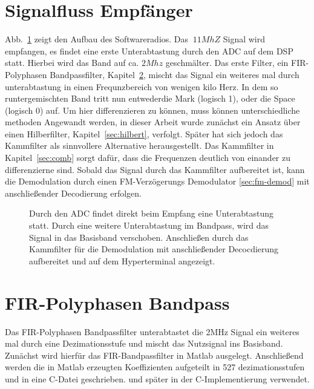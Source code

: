 \documentclass{article}
\begin{document}
\section{Signalfluss Empfänger}

Abb.~\ref{fig:signal} zeigt den Aufbau des Softwareradios. Das $~11MhZ$ Signal wird empfangen, es findet eine erste Unterabtastung durch den ADC auf dem DSP statt.
Hierbei wird das Band auf ca. $2Mhz$ geschmälter. Das erste Filter, ein FIR-Polyphasen Bandpassfilter, Kapitel~\ref{sec:FIR}, mischt das Signal ein weiteres mal durch unterabtastung in einen Frequnzbereich
von wenigen kilo Herz. In dem so runtergemischten Band tritt nun entwederdie Mark (logisch 1), oder die Space (logisch 0) auf. Um hier differenzieren zu können,
muss können unterschiedliche methoden Angewandt werden, in dieser Arbeit wurde zunächst ein Ansatz über einen Hilberfilter, Kapitel~\ref{sec:hilbert}, verfolgt. Später hat sich jedoch das Kammfilter
als sinnvollere Alternative herausgestellt. Das Kammfilter in Kapitel~\ref{sec:comb} sorgt dafür, dass die Frequenzen deutlich von einander zu differenzierne sind. Sobald das Signal durch das Kammfilter
aufbereitet ist, kann die Demodulation durch einen FM-Verzögerungs Demodulator \ref{sec:fm-demod} mit anschließender Decodierung erfolgen.

\begin{figure}[!h]
    \centering
    \def\svgscale{0.5}
    \def\svgwidth{\columnwidth}
    
    \caption{Durch den ADC findet direkt beim Empfang eine Unterabtastung statt. Durch eine weitere Unterabtastung im Bandpass, wird das Signal in das Basisband verschoben.
    Anschließen durch das Kammfilter für die Demodulation mit anschließender Decocdierung aufbereitet und auf dem Hyperterminal angezeigt.}
    \label{fig:signal}
\end{figure}

\section{FIR-Polyphasen Bandpass}\label{sec:FIR}
Das FIR-Polyphasen Bandpassfilter unterabtastet die 2MHz Signal ein weiteres mal durch eine Dezimationsstufe und mischt 
das Nutzsignal ins Basisband. Zunächst wird hierfür das FIR-Bandpassfilter in Matlab ausgelegt.
Anschließend werden die in Matlab erzeugten Koeffizienten aufgeteilt in 527 dezimationsstufen und in eine C-Datei geschrieben.
und später in der C-Implementierung verwendet. 
\end{document}

